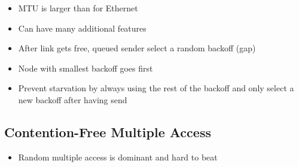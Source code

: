 \begin{itemize}
\begin{itemize}
\begin{itemize}
\begin{itemize}
                            \item MTU is larger than for Ethernet
                            \item Can have many additional features
                        \end{itemize}
                        \begin{itemize}
                            \item After link gets free, queued sender select a random backoff (gap)
                            \item Node with smallest backoff goes first
                            \item Prevent starvation by always using the rest of the backoff and only select a new backoff after having send
                        \end{itemize}
                \end{itemize}
        \end{itemize}
\end{itemize}


\subsection{Contention-Free Multiple Access}
\begin{itemize}
        \begin{itemize}
             Order nodes and each can send (or pass) if it is their turn
            \item Different possible orderings
                \begin{itemize}
                    \item Arrange nodes in a ring
                    \item ``Send permission'' token rotates to each node in turn
                    \ipro Fixed overhead
                    \ipro No collision
                    \ipro Regular change to send
                    \icon Complexity
                        \begin{itemize}
                            \item Who controls the rotation and what if controller does?
                            \item What if token is lost?
                        \end{itemize}
                    \icon Higher overhead at low load
                \end{itemize}
        \end{itemize}
    \item Random multiple access is dominant and hard to beat
\end{itemize}

